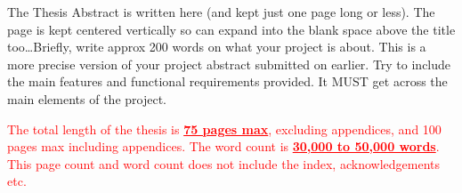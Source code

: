 The Thesis Abstract is written here (and kept just one page long or less). The page is kept centered vertically so can expand into the blank space above the title too\ldots Briefly, write approx 200 words on what your project is about. This is a more precise version of your project abstract submitted on earlier. Try to include the main features and functional requirements provided. It MUST get across the main elements of the project.

\textcolor{red}{The total length of the thesis is \textbf{\underline{75 pages max}}, excluding appendices, and 100 pages max including appendices. The word count is \textbf{\underline{30,000 to 50,000 words}}. This page count and word count does not include the index, acknowledgements etc.}